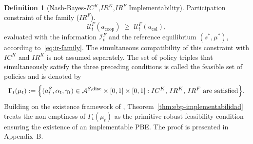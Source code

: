 \documentclass[pdflatex,sn-mathphys-ay]{sn-jnl}
\theoremstyle{plain}
\theoremstyle{definition}
\newtheorem{definition}[theorem]{Definition}
\newcommand{\1}{\mathbf{1}}
\begin{document}
\begin{definition}[Nash-Bayes-$IC^K$,$IR^K$,$IR^F$ Implementability]
\smallskip
\noindent Participation constraint of the family \textup{(}$IR^F$\textup{)}.
\[
\mathcal{U}^F_t(a_{\mathrm{coop}})\;\ge\;\mathcal{U}^F_t(a_{\mathrm{col}}),
\]
evaluated with the information $\mathcal{I}_t^F$ and the reference equilibrium $(s^\ast,\mu^\ast)$, according to~\eqref{eq:ir-family}.
The simultaneous compatibility of this constraint with $IC^K$ and $IR^K$ is not assumed separately. The set of policy triples that simultaneously satisfy the three preceding conditions is called the feasible set of policies and is denoted by
\begin{equation}
\label{eq:gamma-factible}
\Gamma_t(\mu_t)
:=\Bigl\{(a_t^S,\alpha_t,\gamma_t)\in
\mathcal{A}^{S,\mathrm{disc}}\times[0,1]\times[0,1] :
IC^K,\,IR^K,\,IR^F
\text{ are satisfied}\Bigr\}.
\end{equation}
Building on the existence framework of \citet{KadanRenySwinkels2017}, Theorem~\ref{thm:ebp-implementabilidad} treats the non-emptiness of $\Gamma_t(\mu_t)$ as the primitive robust-feasibility condition ensuring the existence of an implementable PBE. The proof is presented in Appendix~B.
\end{definition}
\end{document}
